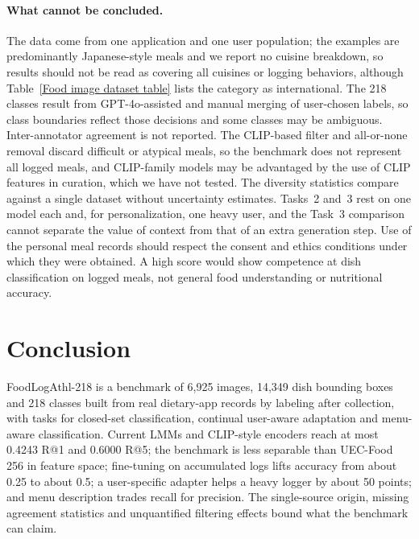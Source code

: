 \documentclass[sigconf, nonacm]{acmart}
\begin{document}
\paragraph{What cannot be concluded.}
The data come from one application and one user population; the examples are predominantly Japanese-style meals and we report no cuisine breakdown, so results should not be read as covering all cuisines or logging behaviors, although Table~\ref{Food image dataset table} lists the category as international. The 218 classes result from GPT-4o-assisted and manual merging of user-chosen labels, so class boundaries reflect those decisions and some classes may be ambiguous. Inter-annotator agreement is not reported. The CLIP-based filter and all-or-none removal discard difficult or atypical meals, so the benchmark does not represent all logged meals, and CLIP-family models may be advantaged by the use of CLIP features in curation, which we have not tested. The diversity statistics compare against a single dataset without uncertainty estimates. Tasks~2 and~3 rest on one model each and, for personalization, one heavy user, and the Task~3 comparison cannot separate the value of context from that of an extra generation step. Use of the personal meal records should respect the consent and ethics conditions under which they were obtained. A high score would show competence at dish classification on logged meals, not general food understanding or nutritional accuracy.

\section{Conclusion}
FoodLogAthl-218 is a benchmark of 6,925 images, 14,349 dish bounding boxes and 218 classes built from real dietary-app records by labeling after collection, with tasks for closed-set classification, continual user-aware adaptation and menu-aware classification. Current LMMs and CLIP-style encoders reach at most 0.4243 R@1 and 0.6000 R@5; the benchmark is less separable than UEC-Food 256 in feature space; fine-tuning on accumulated logs lifts accuracy from about 0.25 to about 0.5; a user-specific adapter helps a heavy logger by about 50 points; and menu description trades recall for precision. The single-source origin, missing agreement statistics and unquantified filtering effects bound what the benchmark can claim.




\end{document}
